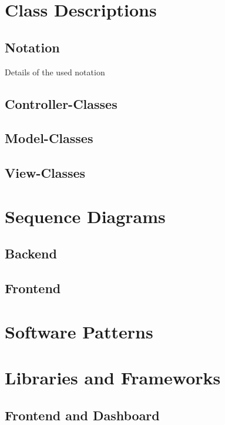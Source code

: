 \documentclass[parskip=full]{scrartcl} %
\begin{document}
\newpage

\section{Class Descriptions}
\subsection{Notation}
Details of the used notation

\subsection{Controller-Classes}

\subsection{Model-Classes}

\subsection{View-Classes}

\newpage

\section{Sequence Diagrams}
\subsection{Backend}
\subsection{Frontend}

\newpage

\section{Software Patterns}

\newpage

\section{Libraries and Frameworks}

\subsection{Frontend and Dashboard}
\end{document}
